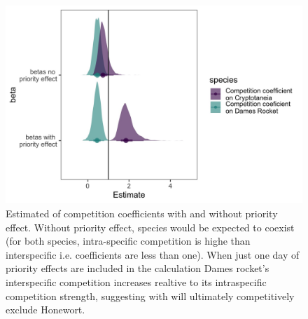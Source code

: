 \documentclass{article}\usepackage[]{graphicx}\usepackage[]{color}
\begin{document}
\begin{figure}[h!]
    \centering
\includegraphics[width=\textwidth]{..//figure/comp_coefficient.jpeg}
    \caption{Estimated of competition coefficients with and without priority effect. Without priority effect, species would be expected to coexist (for both species, intra-specific competition is highe than interspecific i.e. coefficients are less than one). When just one day of priority effects are included in the calculation Dames rocket's interspecific competition increases realtive to its intraspecific competition strength, suggesting with will ultimately competitively exclude Honewort.  } 
    \label{fig:Cc}
\end{figure}
\end{document}
